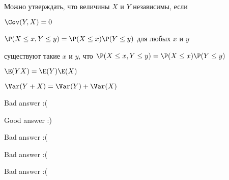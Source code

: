 
\begin{question}
Можно утверждать, что величины \(X\) и \(Y\) независимы, если
\begin{answerlist}
  \item \(\Cov(Y,X)=0\)
  \item \(\P(X\le x, Y\le y)=\P(X\le x)\P(Y\le y)\) для любых \(x\) и \(y\)
  \item существуют такие \(x\) и \(y\), что
\(\P(X\le x, Y\le y)=\P(X\le x)\P(Y\le y)\)
  \item \(\E(YX)=\E(Y)\E(X)\)
  \item \(\Var(Y+X)=\Var(Y)+\Var(X)\)
\end{answerlist}
\end{question}

\begin{solution}
\begin{answerlist}
  \item Bad answer :(
  \item Good answer :)
  \item Bad answer :(
  \item Bad answer :(
  \item Bad answer :(
\end{answerlist}
\end{solution}

